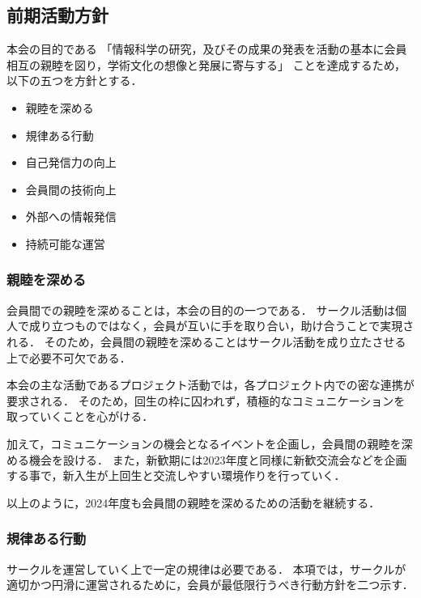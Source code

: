 \subsection*{前期活動方針}


本会の目的である
「情報科学の研究，及びその成果の発表を活動の基本に会員相互の親睦を図り，学術文化の想像と発展に寄与する」
ことを達成するため，以下の五つを方針とする．

\begin{itemize}
  \item 親睦を深める
  \item 規律ある行動
  \item 自己発信力の向上
  \item 会員間の技術向上
  \item 外部への情報発信
  \item 持続可能な運営
\end{itemize}

\subsubsection*{親睦を深める}
会員間での親睦を深めることは，本会の目的の一つである．
サークル活動は個人で成り立つものではなく，会員が互いに手を取り合い，助け合うことで実現される．
そのため，会員間の親睦を深めることはサークル活動を成り立たさせる上で必要不可欠である．

本会の主な活動であるプロジェクト活動では，各プロジェクト内での密な連携が要求される．
そのため，回生の枠に囚われず，積極的なコミュニケーションを取っていくことを心がける．

加えて，コミュニケーションの機会となるイベントを企画し，会員間の親睦を深める機会を設ける．
また，新歓期には2023年度と同様に新歓交流会などを企画する事で，新入生が上回生と交流しやすい環境作りを行っていく．

以上のように，2024年度も会員間の親睦を深めるための活動を継続する．

\subsubsection*{規律ある行動}
サークルを運営していく上で一定の規律は必要である．
本項では，サークルが適切かつ円滑に運営されるために，会員が最低限行うべき行動方針を二つ示す．

